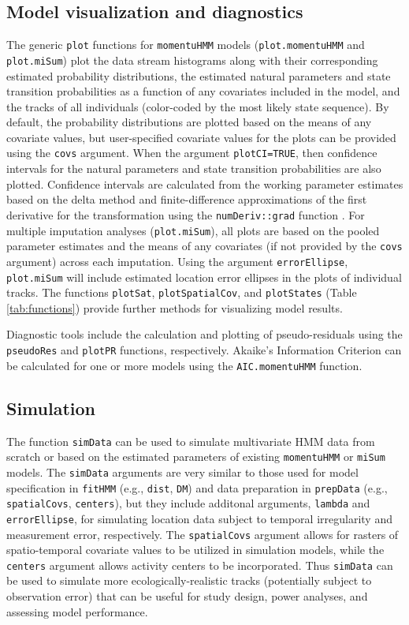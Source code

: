 \documentclass[12pt]{article}
\begin{document}
\subsection{Model visualization and diagnostics}
The generic \verb|plot| functions for \verb|momentuHMM| models (\verb|plot.momentuHMM| and \verb|plot.miSum|) plot the data stream histograms along with their corresponding estimated probability distributions, the estimated natural parameters and state transition probabilities as a function of any covariates included in the model, and the tracks of all individuals (color-coded by the most likely state sequence). By default, the probability distributions are plotted based on the means of any covariate values, but user-specified covariate values for the plots can be provided using the \verb|covs| argument.  When the argument \verb|plotCI=TRUE|, then confidence intervals for the natural parameters and state transition probabilities are also plotted. Confidence intervals are calculated from the working parameter estimates based on the delta method and finite-difference approximations of the first derivative for the transformation using the \verb|numDeriv::grad| function \citep{GilbertVaradhan2016}.  For multiple imputation analyses (\verb|plot.miSum|), all plots are based on the pooled parameter estimates and the means of any covariates (if not provided by the \verb|covs| argument) across each imputation. Using the argument \verb|errorEllipse|, \verb|plot.miSum| will include estimated location error ellipses in the plots of individual tracks. The functions \verb|plotSat|, \verb|plotSpatialCov|, and \verb|plotStates| (Table \ref{tab:functions}) provide further methods for visualizing model results.

Diagnostic tools include the calculation and plotting of pseudo-residuals \citep{ZucchiniEtAl2016} using the \verb|pseudoRes| and \verb|plotPR| functions, respectively. Akaike's Information Criterion can be calculated for one or more models using the \verb|AIC.momentuHMM| function.

\subsection{Simulation}
The function \verb|simData| can be used to simulate multivariate HMM data from scratch or based on the estimated parameters of existing \verb|momentuHMM| or \verb|miSum| models.  The \verb|simData| arguments are very similar to those used for model specification in \verb|fitHMM| (e.g., \verb|dist|, \verb|DM|) and data preparation in \verb|prepData| (e.g., \verb|spatialCovs|, \verb|centers|), but they include additonal arguments, \verb|lambda| and \verb|errorEllipse|, for simulating location data subject to temporal irregularity and measurement error, respectively. The \verb|spatialCovs| argument allows for rasters of spatio-temporal covariate values to be utilized in simulation models, while the \verb|centers| argument allows activity centers to be incorporated. Thus \verb|simData| can be used to simulate more ecologically-realistic tracks (potentially subject to observation error) that can be useful for study design, power analyses, and assessing model performance.
  
\end{document}
